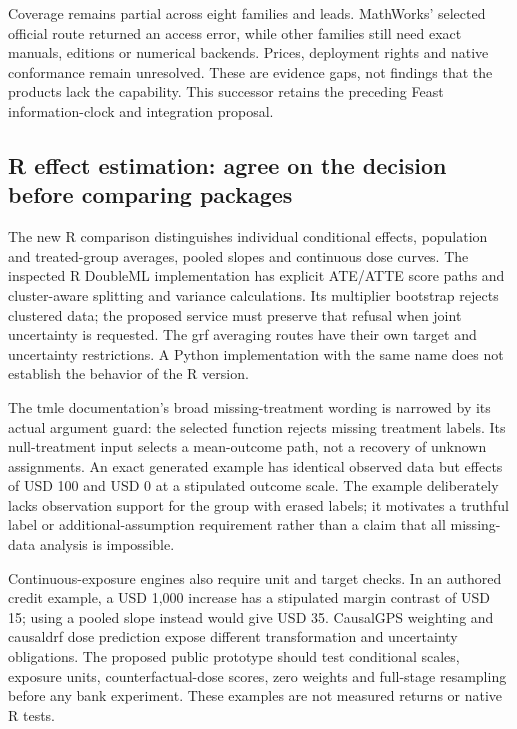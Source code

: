 Coverage remains partial across eight families and leads. MathWorks'
selected official route returned an access error, while other families
still need exact manuals, editions or numerical backends. Prices,
deployment rights and native conformance remain unresolved. These are
evidence gaps, not findings that the products lack the capability. This
successor retains the preceding Feast information-clock and integration
proposal. \citep{sp19feast_reader,sp19feast_progress}

\hypertarget{r-effect-estimation-agree-on-the-decision-before-comparing-packages}{%
\subsection{R effect estimation: agree on the decision before comparing
packages}\label{r-effect-estimation-agree-on-the-decision-before-comparing-packages}}

The new R comparison distinguishes individual conditional effects,
population and treated-group averages, pooled slopes and continuous dose
curves. The inspected R DoubleML implementation has explicit ATE/ATTE
score paths and cluster-aware splitting and variance calculations. Its
multiplier bootstrap rejects clustered data; the proposed service must
preserve that refusal when joint uncertainty is requested. The grf
averaging routes have their own target and uncertainty restrictions. A
Python implementation with the same name does not establish the behavior
of the R version. \citep{exec20_rfx_doubleml_r,exec13_grf_rpath}

The tmle documentation's broad missing-treatment wording is narrowed by
its actual argument guard: the selected function rejects missing
treatment labels. Its null-treatment input selects a mean-outcome path,
not a recovery of unknown assignments. An exact generated example has
identical observed data but effects of USD 100 and USD 0 at a stipulated
outcome scale. The example deliberately lacks observation support for
the group with erased labels; it motivates a truthful label or
additional-assumption requirement rather than a claim that all
missing-data analysis is impossible.
\citep{exec20_rfx_tmle,exec20_rfx_reference}

Continuous-exposure engines also require unit and target checks. In an
authored credit example, a USD 1,000 increase has a stipulated margin
contrast of USD 15; using a pooled slope instead would give USD 35.
CausalGPS weighting and causaldrf dose prediction expose different
transformation and uncertainty obligations. The proposed public
prototype should test conditional scales, exposure units,
counterfactual-dose scores, zero weights and full-stage resampling
before any bank experiment. These examples are not measured returns or
native R tests.
\citep{exec20_rfx_reference,exec20_rfx_causalgps,exec20_rfx_causaldrf}

